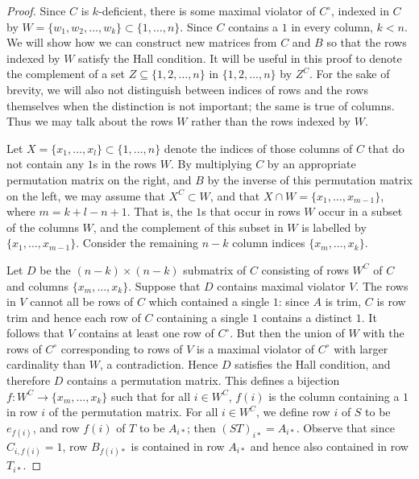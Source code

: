 \documentclass[11pt]{article}
\numberwithin{equation}{section}
\renewcommand{\to}{\longrightarrow}
\begin{document}
\begin{proof}
  Since $C$ is $k$-deficient, there is some maximal violator of $C^\circ$,
  indexed in $C$ by $W  = \{w_1, w_2, \ldots, w_k\} \subset \{1, \ldots, n\}$.
  Since $C$ contains a $1$ in every column, $k < n$. We will show how we can
  construct new matrices from $C$ and $B$ so that the rows indexed by $W$
  satisfy the Hall condition. It will be useful in this proof to denote the
  complement of a set $Z \subseteq \{1, 2, \ldots, n\}$ in $\{1, 2, \ldots, n\}$
  by $Z^C$. For the sake of brevity, we will also not distinguish between
  indices of rows and the rows themselves when the distinction is not important;
  the same is true of columns.  Thus we may talk about the rows $W$ rather than
  the rows indexed by $W$.

  Let $X = \{x_1, \ldots, x_l\} \subset \{1, \ldots, n\}$ denote the indices of
  those columns of $C$ that do not contain any $1$s in the rows $W$.
  By multiplying $C$ by an appropriate permutation matrix on the right, and $B$
  by the inverse of this permutation matrix on the left, we may assume that $X^C
  \subset W$, and that $X \cap W = \{x_1, \ldots, x_{m - 1}\}$, where $m = k + l
  - n + 1$. That is, the $1$s that occur in rows $W$ occur in a subset of the
  columns $W$, and the complement of this subset in $W$ is labelled by $\{x_1,
    \ldots, x_{m - 1}\}$. Consider the remaining $n - k$ column indices $\{x_m,
    \ldots, x_k\}$. 
    
  Let $D$ be the $(n-k) \times (n-k)$ submatrix of $C$ consisting of rows $W^C$
  of $C$ and columns $\{x_m, \ldots, x_k\}$. Suppose that $D$ contains maximal
  violator $V$. The rows in $V$ cannot all be rows of $C$ which contained a
  single $1$: since $A$ is trim, $C$ is row trim and hence each row of $C$
  containing a single $1$ contains a distinct $1$.  It follows that $V$ contains
  at least one row of $C^\circ$. But then the union of $W$ with the rows of
  $C^\circ$ corresponding to rows of $V$ is a maximal violator of $C^\circ$ with
  larger cardinality than $W$, a contradiction. Hence $D$ satisfies the Hall
  condition, and therefore $D$ contains a permutation matrix. This defines a
  bijection $f: W^C \to \{x_m, \ldots, x_k\}$ such that for all $i \in W^C$,
  $f(i)$ is the column containing a $1$ in row $i$ of the permutation matrix.
  For all $i \in W^C$, we define row $i$ of $S$ to be $e_{f(i)}$, and row $f(i)$
  of $T$ to be $A_{i*}$; then $(ST)_{i*} = A_{i*}$. Observe that since
  $C_{i,f(i)} = 1$, row $B_{f(i)*}$ is contained in row $A_{i*}$ and hence also
  contained in row $T_{i*}$.


\end{proof}
\end{document}
